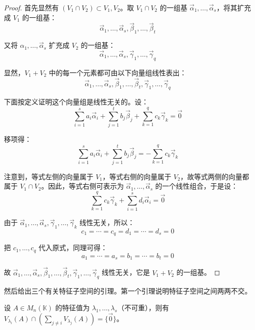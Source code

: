 \begin{proof}
	首先显然有 $(V_1 \cap V_2) \subset V_1, V_2$。取 $V_1 \cap V_2$ 的一组基 $\vec \alpha_1, \ldots, \vec \alpha_s$，将其扩充成 $V_1$ 的一组基：
	$$
	\vec \alpha_1, \ldots, \vec \alpha_s, \vec \beta_1, \ldots, \vec \beta_t
	$$

	又将 $\alpha_1, \ldots, \vec \alpha_s$ 扩充成 $V_2$ 的一组基：
	$$
	\vec \alpha_1, \ldots, \vec \alpha_s, \vec \gamma_1, \ldots, \vec \gamma_q
	$$

	显然，$V_1 + V_2$ 中的每一个元素都可由以下向量组线性表出：
	$$
	\vec \alpha_1, \ldots, \vec \alpha_s, \vec \beta_1, \ldots, \vec \beta_t, \vec \gamma_1, \ldots, \vec \gamma_q
	$$

	下面按定义证明这个向量组是线性无关的。设：
	$$
	\sum\limits_{i = 1}^s a_i \vec \alpha_i + \sum\limits_{j = 1}^t b_j \vec \beta_j + \sum\limits_{k = 1}^q c_k \vec \gamma_k = \vec 0
	$$

	移项得：
	$$
	\sum\limits_{i = 1}^s a_i \vec \alpha_i + \sum\limits_{j = 1}^t b_j \vec \beta_j = - \sum\limits_{k = 1}^q c_k \vec \gamma_k
	$$

	注意到，等式左侧的向量属于 $V_1$，等式右侧的向量属于 $V_2$，故等式两侧的向量都属于 $V_1 \cap V_2$。因此，等式右侧可表示为 $\vec \alpha_1, \ldots, \vec \alpha_s$ 的一个线性组合，于是设：
	$$
	\sum\limits_{k = 1}^q c_k \vec \gamma_k + \sum\limits_{i = 1}^s d_i \vec \alpha_i = \vec 0
	$$

	由于 $\vec \alpha_1, \ldots, \vec \alpha_s, \vec \gamma_1, \ldots, \vec \gamma_k$ 线性无关，所以：
	$$
	c_1 = \cdots = c_q = d_1 = \cdots = d_s = 0
	$$

	把 $c_1, \ldots, c_q$ 代入原式，同理可得：
	$$
	a_1 = \cdots = a_s = b_1 = \cdots = b_t = 0
	$$

	故 $\vec \alpha_1, \ldots, \vec \alpha_s, \vec \beta_1, \ldots, \vec \beta_t, \vec \gamma_1, \ldots, \vec \gamma_q$ 线性无关，它是 $V_1 + V_2$ 的一组基。
\end{proof}

然后给出三个有关特征子空间的引理。第一个引理说明特征子空间之间两两不交。

\begin{theorem}
	设 $A \in M_n(\mathbb K)$ 的特征值为 $\lambda_1, \ldots, \lambda_s$（不可重），则有 $V_{\lambda_i} (A) \cap \left( \sum\limits_{j \ne i} V_{\lambda_j} (A) \right) = \{ \vec 0 \}$。
\end{theorem}

